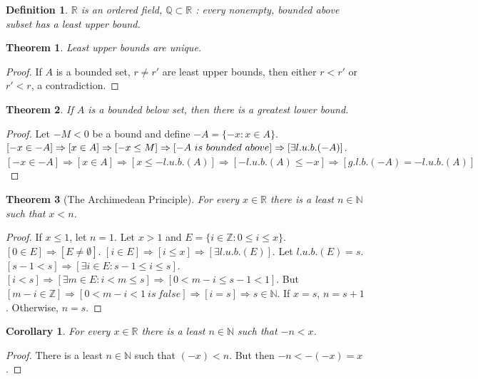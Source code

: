 \documentclass[12pt,oneside]{book}
\theoremstyle{mystyle}
\newtheorem{theorem}{Theorem}[section]
\newtheorem{definition}{Definition}[section]
\newtheorem{corollary}{Corollary}[section]
\begin{document}
\begin{definition}
$\mathbb{R}$ is an ordered field, $\mathbb{Q}\subset \mathbb{R}$ : every nonempty, bounded above subset has a least upper bound.
\end{definition}

\begin{theorem}
Least upper bounds are unique.
\end{theorem}
\begin{proof}
If $A$ is a bounded set, $r\ne r'$ are least upper bounds, then either $r<r'$ or $r'<r$, a contradiction.
\end{proof}

\begin{theorem}
If $A$ is a bounded below set, then there is a greatest lower bound.
\end{theorem}
\begin{proof}
Let $-M<0$ be a bound and define $-A = \{-x: x\in A\}$. $[-x\in -A]\Rightarrow [x\in A]\Rightarrow [-x\leq M]\Rightarrow [-A\ is\ bounded\ above]\\ \Rightarrow [\exists l.u.b.(-A)]$. $[-x\in -A]\Rightarrow [x\in A]\Rightarrow [x\leq -l.u.b.(A)]\Rightarrow [-l.u.b.(A)\leq -x]\Rightarrow [g.l.b.(-A)=-l.u.b.(A)]$
\end{proof}

\begin{theorem}[The Archimedean Principle]
For every $x\in \mathbb{R}$ there is a least $n\in \mathbb{N}$ such that $x<n$. 
\end{theorem}
\begin{proof}
If $x\leq1$, let $n=1$. Let $x>1$ and $E=\{i \in \mathbb{Z}: 0 \leq i \leq x\}$. $[0\in E]\Rightarrow [E\ne \emptyset]$. $[i\in E]\Rightarrow [i\leq x]\Rightarrow [\exists l.u.b.(E)]$. Let $l.u.b.(E)=s$. $[s-1<s]\Rightarrow [\exists i \in E:s-1 \leq i \leq s]$. $[i< s]\Rightarrow[\exists m\in E: i < m \leq s]\Rightarrow [0 < m-i \leq s-1 < 1]$. But $[m-i \in \mathbb{Z}]\Rightarrow [0<m-i<1\ is\ false]\Rightarrow [i = s]\Rightarrow s\in \mathbb{N}$. If $x=s$, $n = s+1$. Otherwise, $n=s$.
\end{proof}

\begin{corollary}
For every $x\in \mathbb{R}$ there is a least $n\in \mathbb{N}$ such that $-n<x$.
\end{corollary}
\begin{proof}
There is a least $n\in \mathbb{N}$ such that $(-x)<n$. But then $-n <-(-x) = x$. 
\end{proof}
\end{document}
